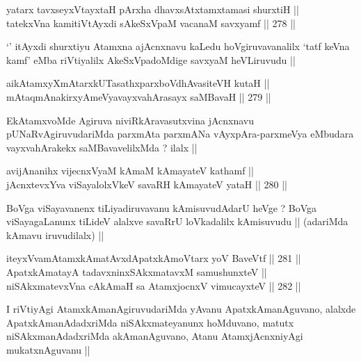 
\begin{shl}
yatarx tavxseyxVtayxtaH pArxha dhavxsAtxtamxtamasi shurxtiH || \\
tatekxVna kamitiVtAyxdi sAkeSxVpaM vacanaM savxyamf ||  278 ||   
\end{shl}

\begin{artha}
`\stext' itAyxdi shurxtiyu Atamxna ajAcnxnavu kaLedu hoVgiruvavanalilx
  `tatf keVna kamf' eMba riVtiyalilx AkeSxVpadoMdige savxyaM
  heVLiruvudu ||
\end{artha}


\begin{shl}
aikAtamxyXmAtarxkUTasathxparxboVdhAvasiteVH kutaH || \\
mAtaqmAnakirxyAmeVyavayxvahArasayx saMBavaH ||  279 ||  
\end{shl}

\begin{artha}
EkAtamxvoMde Agiruva niviRkAravasutxvina jAcnxnavu
pUNaRvAgiruvudariMda parxmAta parxmANa vAyxpAra-parxmeVya eMbudara
vayxvahArakekx saMBavavelilxMda ? ilalx ||
\end{artha}


\begin{shl}
avijAnanihx vijecnxVyaM kAmaM kAmayateV kathamf || \\
jAcnxtevxYva viSayalolxVkeV savaRH kAmayateV yataH ||  280 ||  
\end{shl}

\begin{artha}
BoVga viSayavanenx tiLiyadiruvavanu kAmisuvudAdarU heVge ? BoVga
viSayagaLanunx tiLideV alalxve savaRrU loVkadalilx kAmisuvudu ||
(adariMda kAmavu iruvudilalx) ||
\end{artha}

\begin{shl}
iteyxVvamAtamxkAmatAvxdApatxkAmoV\s tarx yoV BaveVtf ||  281 ||  \\
ApatxkAmatayA tadavxninxSAkxmatavxM samushunxteV || \\
niSAkxmatevxVna cAkAmaH sa AtamxjocnxV vimucayxteV ||  282 ||  
\end{shl}

\begin{artha}
I riVtiyAgi AtamxkAmanAgiruvudariMda yAvanu ApatxkAmanAguvano, alalxde
ApatxkAmanAdadxriMda niSAkxmateyanunx hoMduvano, matutx
niSAkxmanAdadxriMda akAmanAguvano, Atanu AtamxjAcnxniyAgi
mukatxnAguvanu ||
\end{artha}

